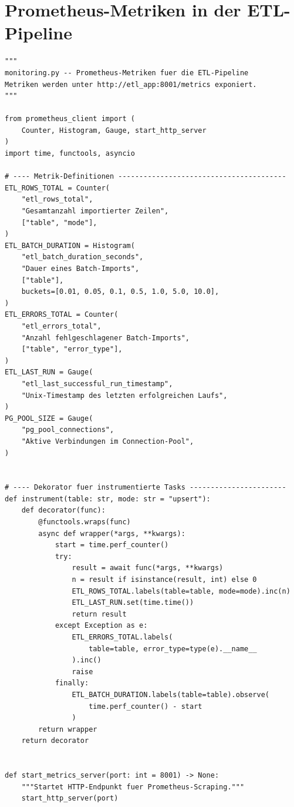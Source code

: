 \documentclass[12pt,a4paper]{report}
\theoremstyle{definition}
\theoremstyle{remark}
\begin{document}
\section{Prometheus-Metriken in der ETL-Pipeline}

\begin{lstlisting}[style=python, caption={monitoring.py: ETL-Metriken via Prometheus-Client}, label=lst:monitoring]
"""
monitoring.py -- Prometheus-Metriken fuer die ETL-Pipeline
Metriken werden unter http://etl_app:8001/metrics exponiert.
"""

from prometheus_client import (
    Counter, Histogram, Gauge, start_http_server
)
import time, functools, asyncio

# ---- Metrik-Definitionen ----------------------------------------
ETL_ROWS_TOTAL = Counter(
    "etl_rows_total",
    "Gesamtanzahl importierter Zeilen",
    ["table", "mode"],
)
ETL_BATCH_DURATION = Histogram(
    "etl_batch_duration_seconds",
    "Dauer eines Batch-Imports",
    ["table"],
    buckets=[0.01, 0.05, 0.1, 0.5, 1.0, 5.0, 10.0],
)
ETL_ERRORS_TOTAL = Counter(
    "etl_errors_total",
    "Anzahl fehlgeschlagener Batch-Imports",
    ["table", "error_type"],
)
ETL_LAST_RUN = Gauge(
    "etl_last_successful_run_timestamp",
    "Unix-Timestamp des letzten erfolgreichen Laufs",
)
PG_POOL_SIZE = Gauge(
    "pg_pool_connections",
    "Aktive Verbindungen im Connection-Pool",
)


# ---- Dekorator fuer instrumentierte Tasks -----------------------
def instrument(table: str, mode: str = "upsert"):
    def decorator(func):
        @functools.wraps(func)
        async def wrapper(*args, **kwargs):
            start = time.perf_counter()
            try:
                result = await func(*args, **kwargs)
                n = result if isinstance(result, int) else 0
                ETL_ROWS_TOTAL.labels(table=table, mode=mode).inc(n)
                ETL_LAST_RUN.set(time.time())
                return result
            except Exception as e:
                ETL_ERRORS_TOTAL.labels(
                    table=table, error_type=type(e).__name__
                ).inc()
                raise
            finally:
                ETL_BATCH_DURATION.labels(table=table).observe(
                    time.perf_counter() - start
                )
        return wrapper
    return decorator


def start_metrics_server(port: int = 8001) -> None:
    """Startet HTTP-Endpunkt fuer Prometheus-Scraping."""
    start_http_server(port)
\end{lstlisting}
\end{document}

